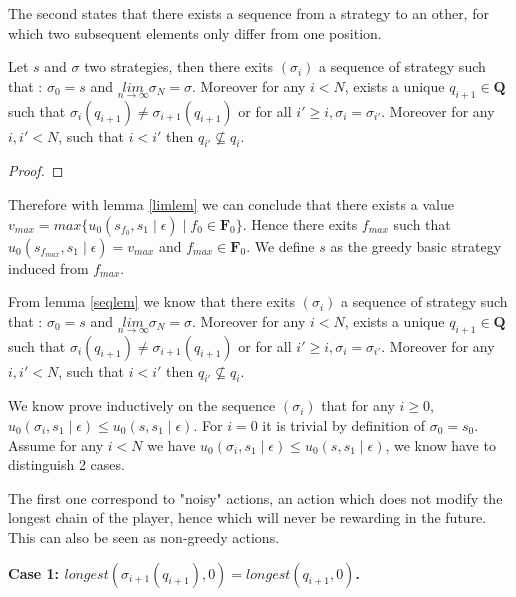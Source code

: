 \documentclass[11pt]{article}
\begin{document}
The second states that there exists a sequence from a strategy to an other, for which two subsequent elements only differ from one position.

\begin{mylem}
\label{seqlem}
Let $s$ and $\sigma$ two strategies, then
there exits $(\sigma_i)$ a sequence of strategy such that : $\sigma_0 = s$ and $\underset{n\rightarrow \infty}{lim}\sigma_N = \sigma$. Moreover for any $i < N$, exists a unique $q_{i+1} \in \mathbf{Q}$ such that $\sigma_{i}(q_{i+1}) \neq \sigma_{i+1}(q_{i+1})$ or for all $i' \geq i, \sigma_{i} = \sigma_{i'}$. Moreover for any $i,i' < N$, such that $i < i'$ then $q_{i'} \not \subseteq q_{i}$.
\end{mylem}
\begin{proof}
\end{proof}

Therefore with lemma \ref{limlem} we can conclude that there exists a value $v_{max} = max \{u_0(s_{f_0},s_1 \mid \epsilon) \mid f_0 \in \mathbf{F}_0 \}$. Hence there exits $f_{max}$ such that $u_0(s_{f_{max}},s_1\mid \epsilon) = v_{max}$ and $f_{max} \in \mathbf{F}_0$. We define $s$ as the greedy basic strategy induced from $f_{max}$.

From lemma \ref{seqlem} we know that there exits $(\sigma_i)$ a sequence of strategy such that : $\sigma_0 = s$ and $\underset{n\rightarrow \infty}{lim}\sigma_N = \sigma$. Moreover for any $i < N$, exists a unique $q_{i+1} \in \mathbf{Q}$ such that $\sigma_{i}(q_{i+1}) \neq \sigma_{i+1}(q_{i+1})$ or for all $i' \geq i, \sigma_{i} = \sigma_{i'}$. Moreover for any $i,i' < N$, such that $i < i'$ then $q_{i'} \not \subseteq q_{i}$.


We know prove inductively on the sequence $(\sigma_i)$ that for any $i \geq 0$, $u_0(\sigma_i,s_1 \mid \epsilon) \leq u_0(s,s_1 \mid \epsilon)$. For $i = 0$ it is trivial by definition of $\sigma_0 = s_0$.
Assume for any $i < N$ we have $u_0(\sigma_i,s_1 \mid \epsilon) \leq u_0(s,s_1 \mid \epsilon)$, we know have to distinguish 2 cases.

\bigskip
The first one correspond to "noisy" actions, an action which does not modify the longest chain of the player, hence which will never be rewarding in the future. This can also be seen as non-greedy actions.

\textbf{Case 1: $longest(\sigma_{i+1}(q_{i+1}),0) = longest(q_{i+1},0)$.}
\end{document}
